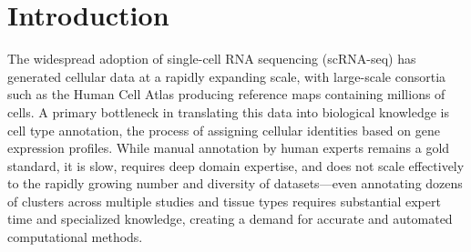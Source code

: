 \documentclass[pdflatex,sn-nature]{sn-jnl}%
\theoremstyle{thmstyleone}%
\theoremstyle{thmstyletwo}%
\theoremstyle{thmstylethree}%
\begin{document}


\maketitle

\section{Introduction}

The widespread adoption of single-cell RNA sequencing (scRNA-seq) has generated cellular data at a rapidly expanding scale, with large-scale consortia such as the Human Cell Atlas producing reference maps containing millions of cells\cite{sikkemaIntegratedCellAtlas2023}. A primary bottleneck in translating this data into biological knowledge is cell type annotation, the process of assigning cellular identities based on gene expression profiles\cite{pasquiniAutomatedMethodsCell2021}. While manual annotation by human experts remains a gold standard, it is slow, requires deep domain expertise, and does not scale effectively to the rapidly growing number and diversity of datasets—even annotating dozens of clusters across multiple studies and tissue types requires substantial expert time and specialized knowledge, creating a demand for accurate and automated computational methods.
\end{document}
